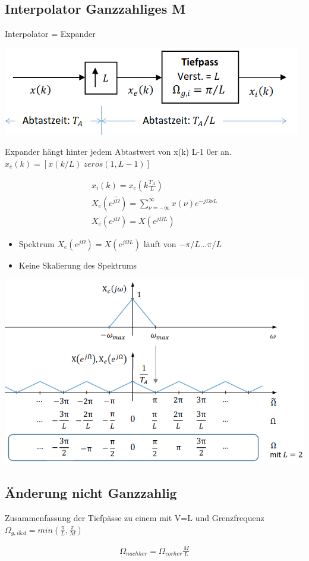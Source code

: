 \documentclass[10pt,a4paper]{article}
\begin{document}
\subsection{Interpolator Ganzzahliges M}
Interpolator = Expander
  \begin{center}
      \includegraphics[width=.35\textwidth]{./img/interpol.png}
  \end{center}
Expander hängt hinter jedem Abtastwert von x(k) L-1 0er an.
$x_e(k)= [x(k/L) \ zeros(1,L-1)]$
  \begin{mdframed}[style=exercise]
    \begin{align}
        x_i(k)=x_c(k\frac{T_A}{L})\\
        X_e(e^{j\tilde{\Omega}})=\sum_{\nu=-\infty}^{\infty} x(\nu)e^{-j\Omega\nu L}\\
        X_e(e^{j\Omega}) =X(e^{j\Omega L})
    \end{align}
  \end{mdframed}
  \begin{itemize}
    \item Spektrum $X_e(e^{j\Omega}) =X(e^{j\Omega L})$ läuft von $-\pi/L ...\pi/L$
    \item Keine Skalierung des Spektrums 
  \end{itemize}
  \begin{center}
      \includegraphics[width=.35\textwidth]{./img/interpol2.png}
  \end{center}
\subsection{Änderung nicht Ganzzahlig}
Zusammenfassung der Tiefpässe zu einem mit V=L und Grenzfrequenz $\Omega_{g,i\&d}=min(\frac{\pi}{L}, \frac{\pi}{M})$
  \begin{mdframed}[style=exercise]
    \begin{align}
        \Omega_{nachher}=\Omega_{vorher}\frac{M}{L}
    \end{align}
  \end{mdframed}
\end{document}
